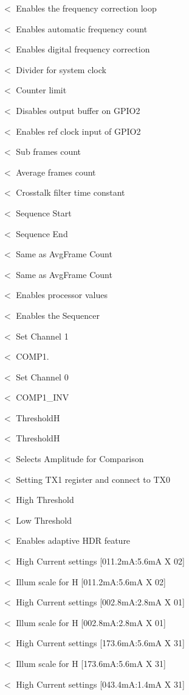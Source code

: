 $<$ Enables the frequency correction loop

$<$ Enables automatic frequency count

$<$ Enables digital frequency correction

$<$ Divider for system clock

$<$ Counter limit

$<$ Disables output buffer on G\+P\+I\+O2

$<$ Enables ref clock input of G\+P\+I\+O2

$<$ Sub frames count

$<$ Average frames count

$<$ Crosstalk filter time constant

$<$ Sequence Start

$<$ Sequence End

$<$ Same as Avg\+Frame Count

$<$ Same as Avg\+Frame Count

$<$ Enables processor values

$<$ Enables the Sequencer

$<$ Set Channel 1

$<$ C\+O\+M\+P1.

$<$ Set Channel 0

$<$ C\+O\+M\+P1\+\_\+\+I\+NV

$<$ ThresholdH

$<$ ThresholdH

$<$ Selects Amplitude for Comparison

$<$ Setting T\+X1 register and connect to T\+X0

$<$ High Threshold

$<$ Low Threshold

$<$ Enables adaptive H\+DR feature

$<$ High Current settings \mbox{[}011.\+2mA\+:5.\+6mA X 02\mbox{]}

$<$ Illum scale for H \mbox{[}011.\+2mA\+:5.\+6mA X 02\mbox{]}

$<$ High Current settings \mbox{[}002.\+8mA\+:2.\+8mA X 01\mbox{]}

$<$ Illum scale for H \mbox{[}002.\+8mA\+:2.\+8mA X 01\mbox{]}

$<$ High Current settings \mbox{[}173.\+6mA\+:5.\+6mA X 31\mbox{]}

$<$ Illum scale for H \mbox{[}173.\+6mA\+:5.\+6mA X 31\mbox{]}

$<$ High Current settings \mbox{[}043.\+4mA\+:1.\+4mA X 31\mbox{]}

